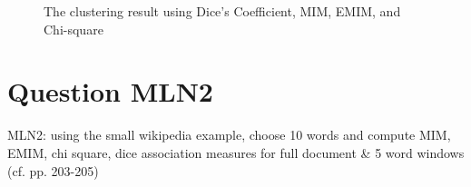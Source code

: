 \documentclass[letterpaper,11pt]{article}
\begin{document}
\begin{figure}[H]
	\centering
	\caption{The clustering result using Dice's Coefficient, MIM, EMIM, and Chi-square}
	\label{fig:mln1_result}
\end{figure}
    
\noindent\makebox[\linewidth]{\rule{\textwidth}{0.4pt}}


\section*{Question MLN2}
\begin{spverbatim}
MLN2: using the small wikipedia example, choose 10 words and compute MIM, EMIM, chi square, dice association measures for full document & 5 word windows (cf. pp. 203-205)
\end{spverbatim}
\end{document}
